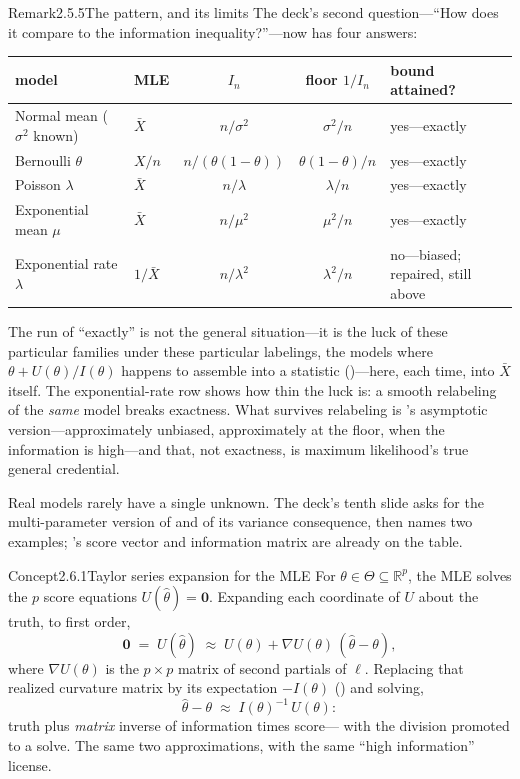 \documentclass[main.tex]{subfiles}
\begin{document}
\begin{ObjL}{Remark}{2.5.5}{The pattern, and its limits}
The deck's second question---``How does it compare to the information inequality?''---now
has four answers:
\begin{center}\footnotesize
\begin{tabular}{llccl}
\hline
model & MLE & $I_n$ & floor $1/I_n$ & bound attained? \\
\hline
Normal mean ($\sigma^2$ known) & $\bar X$ & $n/\sigma^2$ & $\sigma^2/n$ & yes---exactly \\
Bernoulli $\theta$ & $X/n$ & $n/(\theta(1-\theta))$ & $\theta(1-\theta)/n$ & yes---exactly \\
Poisson $\lambda$ & $\bar X$ & $n/\lambda$ & $\lambda/n$ & yes---exactly \\
Exponential mean $\mu$ & $\bar X$ & $n/\mu^2$ & $\mu^2/n$ & yes---exactly \\
Exponential rate $\lambda$ & $1/\bar X$ & $n/\lambda^2$ & $\lambda^2/n$ &
  no---biased; repaired, still above \\
\hline
\end{tabular}
\end{center}
\smallskip
The run of ``exactly'' is not the general situation---it is the luck of these particular
families under these particular labelings, the models where $\theta+U(\theta)/I(\theta)$
happens to assemble into a statistic ()---here, each time, into $\bar X$
itself. The exponential-rate row shows how thin the luck is: a
smooth relabeling of the \emph{same} model breaks exactness. What survives relabeling is
's asymptotic version---approximately unbiased, approximately at the floor, when
the information is high---and that, not exactness, is maximum likelihood's true general
credential.
\end{ObjL}


Real models rarely have a single unknown. The deck's tenth slide asks for the
multi-parameter version of  and of its variance consequence, then names two
examples; 's score vector and information matrix are already on the table.

\begin{ObjL}{Concept}{2.6.1}{Taylor series expansion for the MLE}
For $\theta\in\Theta\subseteq\mathbb{R}^p$, the MLE solves the $p$ score equations
$U(\hat\theta)=\mathbf 0$. Expanding each coordinate of $U$ about the truth, to first
order,
\[ \mathbf 0 \;=\; U(\hat\theta) \;\approx\; U(\theta) +
   \nabla U(\theta)\,(\hat\theta-\theta) , \]
where $\nabla U(\theta)$ is the $p\times p$ matrix of second partials of $\ell$. Replacing
that realized curvature matrix by its expectation $-I(\theta)$ () and solving,
\[ \hat\theta - \theta \;\approx\; I(\theta)^{-1}\, U(\theta) : \]
truth plus \emph{matrix} inverse of information times score--- with the division
promoted to a solve. The same two approximations, with the same ``high information'' license.
\end{ObjL}
\end{document}
